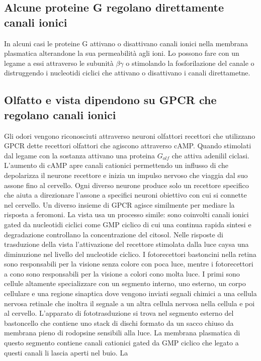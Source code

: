 \subsection{Alcune proteine G regolano direttamente canali ionici}
In alcuni casi le proteine G attivano o disattivano canali ionici nella membrana plasmatica alterandone la sua permeabilit\`a agli ioni. Lo possono fare con un legame a essi attraverso
le subunit\`a $\beta\gamma$ o stimolando la fosforilazione del canale o distruggendo i nucleotidi ciclici che attivano o disattivano i canali direttametne. 
\subsection{Olfatto e vista dipendono su GPCR che regolano canali ionici}
Gli odori vengono riconosciuti attraverso neuroni olfattori recettori che utilizzano GPCR dette recettori olfattori che agiscono attraverso cAMP. Quando stimolati dal legame con la 
sostanza attivano una proteina $G_{olf}$ che attiva adenilil ciclasi. L'aumento di cAMP apre canali cationici permettendo un influsso di  che depolarizza il neurone recettore e
inizia un impulso nervoso che viaggia dal suo assone fino al cervello. Ogni diverso neurone produce solo un recettore specifico che aiuta a direzionare l'assone a specifici neuroni
obiettivo con cui si connette nel cervello. Un diverso insieme di GPCR agisce similmente per mediare la risposta a feromoni. La vista usa un processo simile: sono coinvolti canali
ionici gated da nucleotidi ciclici come GMP ciclico di cui una continua rapida sintesi e degradazione controllano la concentrazione del citosol. Nelle risposte di trasduzione della vista
l'attivazione del recettore stimolata dalla luce caysa una diminuzione nel livello del nucleotide ciclico. I fotorecettori bastoncini nella retina sono responsabili per la visione
senza colore con poca luce, mentre i fotorecettori a cono sono responsabili per la visione a colori cono molta luce. I primi sono cellule altamente specializzare con un segmento interno,
uno esterno, un corpo cellulare e una regione sinaptica dove vengono inviati segnali chimici a una cellula nervosa retinale che inoltra il segnale a un altra cellula nervosa nella 
cellula e poi al cervello. L'apparato di fototrasduzione si trova nel segmento esterno del bastoncello che contiene uno stack di dischi formato da un sacco chiuso da membrana pieno di
rodopsine sensibili alla luce. La membrana plasmatica di questo segmento contiene canali cationici gated da GMP ciclico che legato a questi canali li lascia aperti nel buio. La 
